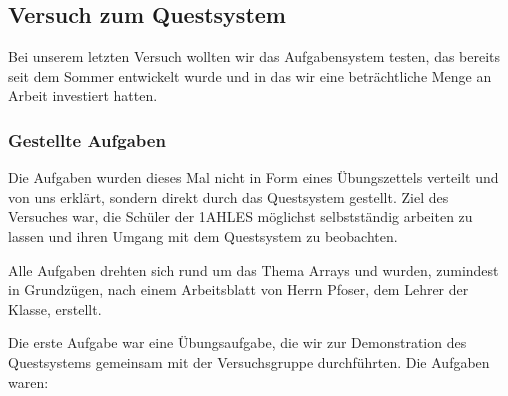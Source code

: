 

\subsection{Versuch zum Questsystem}
\label{sec:sci-trial-quest}
Bei unserem letzten Versuch wollten wir das Aufgabensystem testen, das bereits seit dem Sommer entwickelt wurde und in das wir eine beträchtliche Menge an Arbeit investiert hatten.

\subsubsection*{Gestellte Aufgaben}
Die Aufgaben wurden dieses Mal nicht in Form eines Übungszettels verteilt und von uns erklärt, sondern direkt durch das Questsystem gestellt. Ziel des Versuches war, die Schüler der 1AHLES möglichst selbstständig arbeiten zu lassen und ihren Umgang mit dem Questsystem zu beobachten.

Alle Aufgaben drehten sich rund um das Thema \glqq{}Arrays\grqq{} und wurden, zumindest in Grundzügen, nach einem Arbeitsblatt von Herrn Pfoser, dem Lehrer der Klasse, erstellt.

Die erste Aufgabe war eine Übungsaufgabe, die wir zur Demonstration des Questsystems gemeinsam mit der Versuchsgruppe durchführten. Die Aufgaben waren:

